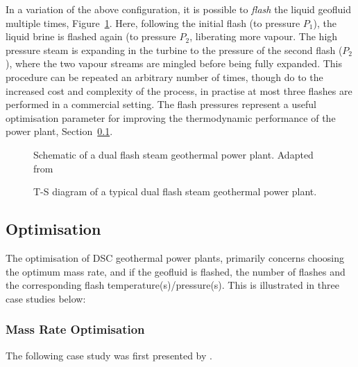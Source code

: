         In a variation of the above configuration, it is possible to \emph{flash} the liquid geofluid multiple times, Figure~\ref{fig:litrev_multiflash_schematic}. Here, following the initial flash (to pressure \(P_1\)), the liquid brine is flashed again (to pressure \(P_2\), liberating more vapour. The high pressure steam is expanding in the turbine to the pressure of the second flash (\(P_2\)), where the two vapour streams are mingled before being fully expanded. This procedure can be repeated an arbitrary number of times, though do to the increased cost and complexity of the process, in practise at most three flashes are performed in a commercial setting. The flash pressures represent a useful optimisation parameter for improving the thermodynamic performance of the power plant, Section~\ref{sec:litrev_DSC_opt}.

        \begin{figure}[H]
            \centering
            \resizebox{\linewidth}{!}{}
            \caption{Schematic of a dual flash steam geothermal power plant. Adapted from \cite{DiPippo2016}}
            \label{fig:litrev_multiflash_schematic}
        \end{figure}

        \begin{figure}[H]
            \centering
            
            \caption{T-S diagram of a typical dual flash steam geothermal power plant.}
            \label{fig:litrev_multiflash_TS}
        \end{figure}

    \subsection{Optimisation}
        \label{sec:litrev_DSC_opt}

        The optimisation of \ac{DSC} geothermal power plants, primarily concerns choosing the optimum mass rate, and if the geofluid is flashed, the number of flashes and the corresponding flash temperature(s)/pressure(s). This is illustrated in three case studies below:

        \subsubsection{Mass Rate Optimisation}
            \label{sec:dsc_mrate_opt}
            The following case study was first presented by \citeauthor{DiPippo2016} \cite{DiPippo2016}.
            
